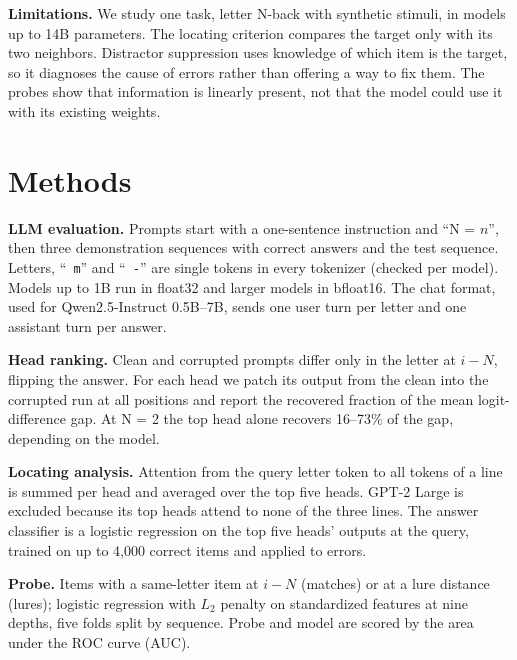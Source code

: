 \documentclass{article}
\begin{document}
\textbf{Limitations.} We study one task, letter N-back with synthetic stimuli, in models up to 14B parameters. The locating criterion compares the target only with its two neighbors. Distractor suppression uses knowledge of which item is the target, so it diagnoses the cause of errors rather than offering a way to fix them. The probes show that information is linearly present, not that the model could use it with its existing weights.




\appendix

\section{Methods}
\label{app:methods}

\textbf{LLM evaluation.} Prompts start with a one-sentence instruction and ``N = $n$'', then three demonstration sequences with correct answers and the test sequence. Letters, ``\texttt{ m}'' and ``\texttt{ -}'' are single tokens in every tokenizer (checked per model). Models up to 1B run in float32 and larger models in bfloat16. The chat format, used for Qwen2.5-Instruct 0.5B--7B, sends one user turn per letter and one assistant turn per answer.

\textbf{Head ranking.} Clean and corrupted prompts differ only in the letter at $i-N$, flipping the answer. For each head we patch its output from the clean into the corrupted run at all positions and report the recovered fraction of the mean logit-difference gap. At N = 2 the top head alone recovers 16--73\% of the gap, depending on the model.

\textbf{Locating analysis.} Attention from the query letter token to all tokens of a line is summed per head and averaged over the top five heads. GPT-2 Large is excluded because its top heads attend to none of the three lines. The answer classifier is a logistic regression on the top five heads' outputs at the query, trained on up to 4,000 correct items and applied to errors.

\textbf{Probe.} Items with a same-letter item at $i-N$ (matches) or at a lure distance (lures); logistic regression with $L_2$ penalty on standardized features at nine depths, five folds split by sequence. Probe and model are scored by the area under the ROC curve (AUC).
\end{document}
